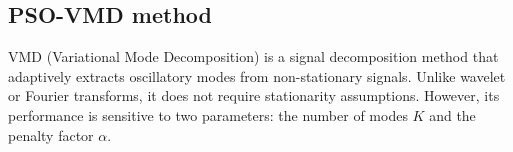 \documentclass[3p,authoryear,preprint,12pt]{elsarticle}
\begin{document}
%
%
%
\subsection{PSO-VMD method}

VMD (Variational Mode Decomposition) \citep{dragomiretskiyVariationalModeDecomposition2014} is a signal decomposition method that adaptively extracts oscillatory modes from non-stationary signals. {Unlike wavelet or Fourier transforms, it does not require stationarity assumptions. However, its performance is sensitive to two parameters: the number of modes $K$ and the penalty factor $\alpha$.}
\end{document}
